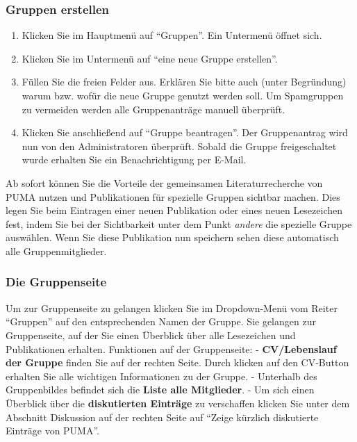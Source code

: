 \documentclass[a4paper,11pt,twoside]{scrbook}
\begin{document}
\subsubsection{Gruppen erstellen}
\begin{enumerate}
    \item Klicken Sie im Hauptmenü auf \enquote{Gruppen}. Ein Untermenü öffnet sich.
    \item Klicken Sie im Untermenü auf \enquote{eine neue Gruppe erstellen}.
    \item Füllen Sie die freien Felder aus. Erklären Sie bitte auch (unter Begründung) warum bzw. wofür die neue Gruppe genutzt werden soll.   Um Spamgruppen zu vermeiden werden alle Gruppenanträge manuell überprüft. 
    \item Klicken Sie anschließend auf \enquote{Gruppe beantragen}. Der Gruppenantrag wird nun von den Administratoren überprüft. Sobald die Gruppe freigeschaltet wurde erhalten Sie ein Benachrichtigung per E-Mail.
\end{enumerate}
Ab sofort können Sie die Vorteile der gemeinsamen Literaturrecherche von PUMA nutzen und Publikationen  für spezielle Gruppen sichtbar machen. Dies legen Sie beim Eintragen einer neuen Publikation oder eines neuen Lesezeichen fest, indem Sie bei der Sichtbarkeit unter dem Punkt \textit{andere} die spezielle Gruppe auswählen. Wenn Sie diese Publikation nun speichern sehen diese automatisch alle Gruppenmitglieder.
\subsubsection{Die Gruppenseite}
Um zur Gruppenseite zu gelangen klicken Sie im Dropdown-Menü vom Reiter  \enquote{Gruppen} auf den entsprechenden Namen der Gruppe. Sie gelangen zur Gruppenseite, auf der Sie einen Überblick über alle Lesezeichen und Publikationen erhalten.%
\newline
Funktionen auf der Gruppenseite:\newline
- \textbf{CV/Lebenslauf der Gruppe} finden Sie auf der rechten Seite. Durch klicken auf den CV-Button erhalten Sie alle wichtigen Informationen zu der Gruppe. \newline - Unterhalb des Gruppenbildes befindet sich die \textbf{Liste alle Mitglieder}. \newline - Um sich einen Überblick über die \textbf{diskutierten Einträge} zu verschaffen klicken Sie unter dem Abschnitt Diskussion auf der rechten Seite auf \enquote{Zeige kürzlich diskutierte Einträge von PUMA}.  
\end{document}
